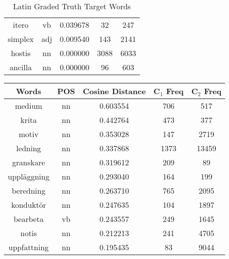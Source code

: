 \begin{table}
\begin{tabular}{ccccc}
itero            & vb            & 0.039678           & 32                 & 247                 \\
simplex          & adj           & 0.009540           & 143                & 2141                \\
hostis           & nn            & 0.000000           & 3088               & 6033                \\
ancilla          & nn            & 0.000000           & 96                 & 603                 \\
\bottomrule
\end{tabular}
\caption{Latin Graded Truth Target Words}
\label{tab:lat-truthtargets}
\end{table}



\begin{table}
\centering
\begin{tabular}{ccccc} 
\toprule
\textbf{ Words } & \textbf{ POS } & \textbf{ Cosine Distance } & \textbf{ C$_1$ Freq } & \textbf{ C$_2$ Freq }  \\ 
\midrule
medium           & nn            & 0.603554           & 706                & 517                 \\
krita            & nn            & 0.442764           & 473                & 377                 \\
motiv            & nn            & 0.353028           & 147                & 2719                \\
ledning          & nn            & 0.337868           & 1373               & 13459               \\
granskare        & nn            & 0.319612           & 209                & 89                  \\
uppläggning      & nn            & 0.293040           & 164                & 199                 \\
beredning        & nn            & 0.263710           & 765                & 2095                \\
konduktör        & nn            & 0.247635           & 104                & 1897                \\
bearbeta         & vb            & 0.243557           & 249                & 1645                \\
notis            & nn            & 0.212213           & 241                & 4705                \\
uppfattning      & nn            & 0.195435           & 83                 & 9044                \\

\end{tabular}
\end{table}
